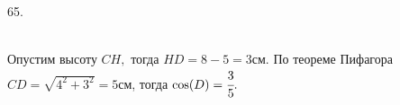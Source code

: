 65. \begin{figure}[ht!]
\end{figure}\\
Опустим высоту $CH,$ тогда $HD=8-5=3$см. По теореме Пифагора $CD=\sqrt{4^2+3^2}=5$см, тогда $\cos(D)=\cfrac{3}{5}.$\\
